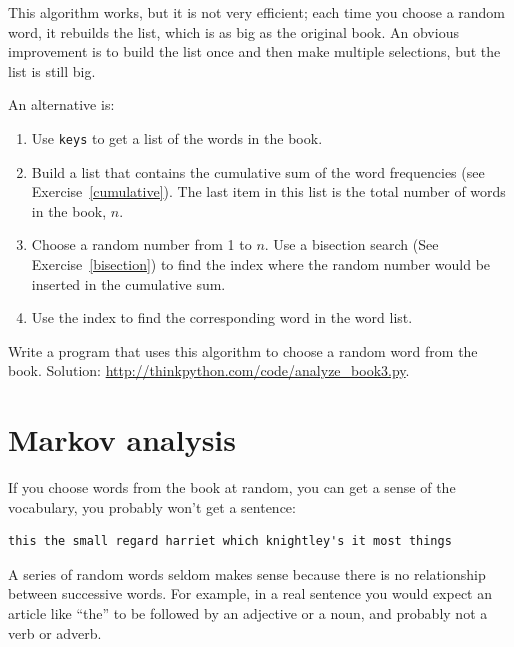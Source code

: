 \documentclass[10pt]{book}
\begin{document}
\begin{exercise}
\label{randhist}

This algorithm works, but it is not very efficient; each time you
choose a random word, it rebuilds the list, which is as big as
the original book.  An obvious improvement is to build the list
once and then make multiple selections, but the list is still big.

An alternative is:

\begin{enumerate}

\item Use {\tt keys} to get a list of the words in the book.

\item Build a list that contains the cumulative sum of the word
  frequencies (see Exercise~\ref{cumulative}).  The last item
  in this list is the total number of words in the book, $n$.

\item Choose a random number from 1 to $n$.  Use a bisection search
  (See Exercise~\ref{bisection}) to find the index where the random
  number would be inserted in the cumulative sum.

\item Use the index to find the corresponding word in the word list.

\end{enumerate}

Write a program that uses this algorithm to choose a random
word from the book.  Solution: \url{http://thinkpython.com/code/analyze_book3.py}.

\end{exercise}



\section{Markov analysis}
\label{markov}

If you choose words from the book at random, you can get a
sense of the vocabulary, you probably won't get a sentence:

\begin{verbatim}
this the small regard harriet which knightley's it most things
\end{verbatim}
%
A series of random words seldom makes sense because there
is no relationship between successive words.  For example, in
a real sentence you would expect an article like ``the'' to
be followed by an adjective or a noun, and probably not a verb
or adverb.
\end{document}
